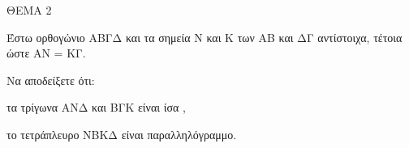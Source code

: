 
ΘΕΜΑ 2

Έστω ορθογώνιο ΑΒΓΔ και τα σημεία Ν και Κ των ΑΒ και ΔΓ αντίστοιχα, τέτοια ώστε ΑΝ = ΚΓ.

Να αποδείξετε ότι:

\begin{alist}
\item τα τρίγωνα ΑΝΔ και ΒΓΚ είναι ίσα , 

\item το τετράπλευρο ΝΒΚΔ είναι παραλληλόγραμμο. 
\end{alist}

